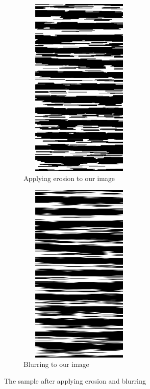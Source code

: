 \begin{itemize}
         \begin{figure}[!htb]
             \centering
             \begin{subfigure}[b]{0.4\textwidth}
                \centering
                \includegraphics[width=6cm, height=9cm]{images/erosion.png}
                \caption{Applying erosion to our image}
                \label{fig:erosio_img}
             \end{subfigure}
             \hfill
             \begin{subfigure}[b]{0.4\textwidth}
                \centering
                \includegraphics[width=6cm, height=9cm]{images/blureImg.png}
                \caption{Blurring to our image}
                \label{fig:Blurring}
             \end{subfigure}
            \caption{The sample after applying erosion and blurring}
            \label{fig:erosion-blurring}
        \end{figure}
        

\end{itemize}
